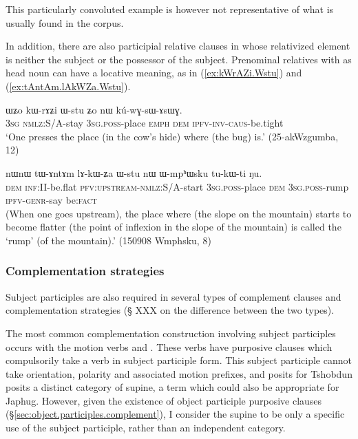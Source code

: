  This particularly convoluted example is however not representative of what is usually found in the corpus.


In addition, there are also participial relative clauses in  whose relativized element is neither the subject or the possessor of the subject. Prenominal relatives with  as head noun can have a locative meaning, as in (\ref{ex:kWrAZi.Wstu}) and (\ref{ex:tAntAm.lAkWZa.Wstu}).
 
\begin{exe}
\ex \label{ex:kWrAZi.Wstu}
 \gll ɯʑo kɯ-rɤʑi ɯ-stu ʑo nɯ kú-wɣ-sɯ-ɤsɯɣ. \\
\textsc{3sg} \textsc{nmlz}:S/A-stay \textsc{3sg}.\textsc{poss}-place \textsc{emph} \textsc{dem} \textsc{ipfv}-\textsc{inv}-\textsc{caus}-be.tight \\
\glt `One presses the place (in the cow's hide) where (the bug) is.' (25-akWzgumba, 12)
\end{exe}

\begin{exe}
\ex \label{ex:tAntAm.lAkWZa.Wstu}
 \gll nɯnɯ tɯ-ɤntɤm lɤ-kɯ-ʑa ɯ-stu nɯ ɯ-mpʰɯsku tu-kɯ-ti ŋu. \\
\textsc{dem} \textsc{inf}:II-be.flat \textsc{pfv}:\textsc{upstream}-\textsc{nmlz}:S/A-start \textsc{3sg}.\textsc{poss}-place \textsc{dem} \textsc{3sg}.\textsc{poss}-rump \textsc{ipfv}-\textsc{genr}-say be:\textsc{fact} \\
\glt  (When one goes upstream), the place where (the slope on the mountain) starts to become flatter (the point of inflexion in the slope of the mountain) is called  the `rump' (of the mountain).' (150908 Wmphsku, 8)
  \end{exe}
  
  \subsubsection{Complementation strategies}  \label{sec:subject.participle.complementation}
Subject participles are also required in several types of complement clauses and complementation strategies (§ XXX on the difference between the two types).

The most common complementation construction involving subject participles occurs with the motion verbs  and . These verbs have purposive clauses which compulsorily take a verb in  subject participle form. This subject participle cannot take orientation, polarity and associated motion prefixes, and \citet{sun12complementation} posits for Tshobdun posits a distinct category of supine, a term which could also be appropriate for Japhug. However, given the existence of object participle purposive clauses (§\ref{sec:object.participles.complement}), I consider the supine to be only a specific use of the subject participle, rather than an independent category.

